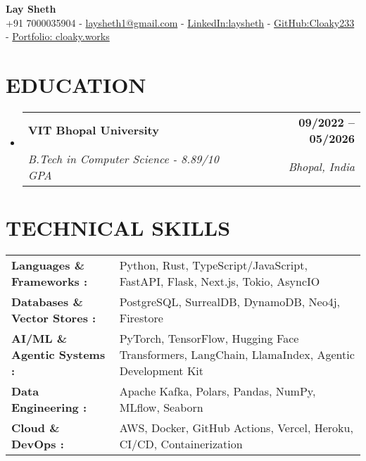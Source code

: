 \documentclass[letterpaper,11pt]{article}
\makeatletter
\def\spaceBelowHeaderContact{-2pt}
\def\spaceBelowEdSec{-8pt}
\def\spaceBelowTechSecContent{-8pt}
\def\spaceBetweenSubheadings{-1pt}
\def\spaceAfterSubheading{-7pt}
\newcommand{\resumeSubheading}[4]{
  \vspace{\spaceBetweenSubheadings}\item
    \begin{tabular*}{1.0\textwidth}[t]{l@{\extracolsep{\fill}}r}
      \textbf{\normalsize#1} & \textbf{\small #2} \\
      \textit{\normalsize#3} & \textit{\small #4} \\
    \end{tabular*}\vspace{\spaceAfterSubheading}
}
\newcommand{\resumeSubHeadingListStart}{\begin{itemize}[leftmargin=0.0in, label={}]}
\newcommand{\resumeSubHeadingListEnd}{\end{itemize}\vspace{\spaceBelowEdSec}}
\makeatother
\begin{document}
\begin{center}
    {\huge \textbf{Lay Sheth}} \\ \vspace{1pt}
    {+91 7000035904}
    \small{ - }
    {\href{mailto://laysheth1@gmail.com}{laysheth1@gmail.com}}
    \small{ - }
    {\href{https://www.linkedin.com/in/laysheth}{LinkedIn:laysheth}}
    \small{ - }
    {\href{https://github.com/CLoaKY233}{GitHub:Cloaky233}}
    \small{ - }
    {\href{https://cloaky.works}{Portfolio: cloaky.works}}
    \vspace{\spaceBelowHeaderContact}
\end{center}

\section{{EDUCATION}}
\resumeSubHeadingListStart
    \resumeSubheading
      {VIT Bhopal University}{09/2022 -- 05/2026}
      {B.Tech in Computer Science - 8.89/10 GPA}{Bhopal, India}
\resumeSubHeadingListEnd


\section{TECHNICAL SKILLS}
\vspace{2pt}
\begin{tabularx}{\textwidth}{@{} l >{\raggedright\arraybackslash}X @{}}
    \small\textbf{Languages \& Frameworks : } & \small Python, Rust, TypeScript/JavaScript, FastAPI, Flask, Next.js, Tokio, AsyncIO \\
    \small\textbf{Databases \& Vector Stores : } & \small PostgreSQL, SurrealDB, DynamoDB, Neo4j, Firestore \\
    \small\textbf{AI/ML \& Agentic Systems : } & \small PyTorch, TensorFlow, Hugging Face Transformers, LangChain, LlamaIndex, Agentic Development Kit \\
    \small\textbf{Data Engineering : } & \small Apache Kafka, Polars, Pandas, NumPy, MLflow, Seaborn \\
    \small\textbf{Cloud \& DevOps : } & \small AWS, Docker, GitHub Actions, Vercel, Heroku, CI/CD, Containerization \\
\end{tabularx}
\vspace{\spaceBelowTechSecContent}


\vspace{-2pt}
\end{document}
